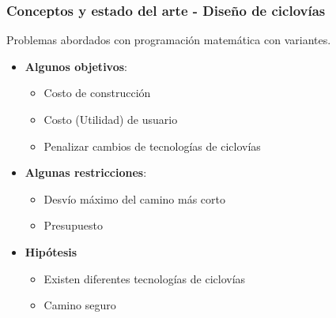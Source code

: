 \documentclass[aspectratio=43, 10pt]{beamer}
\begin{document}

\begin{frame}
    \frametitle{Conceptos y estado del arte - Diseño de ciclovías}

    Problemas abordados con programación matemática con variantes.

\begin{itemize} \item{
        \textbf{Algunos objetivos}:
        \begin{itemize}
            \item{Costo de construcción \parencite{Duthie2014}}
            \item{Costo (Utilidad) de usuario \parencite{Mauttone2017, Liu2019, baya2021}}
            \item{Penalizar cambios de tecnologías de ciclovías \parencite{baya2021}}
        \end{itemize}
    }
    \item{
        \textbf{Algunas restricciones}:
        \begin{itemize}
            \item{Desvío máximo del camino más corto \parencite{Duthie2014, lim2021}}
        \item{Presupuesto}
        \end{itemize}
    }
    \item{
        \textbf{Hipótesis}
        \begin{itemize}
            \item{Existen diferentes tecnologías de ciclovías \parencite{baya2021, Zhu2019}}
            \item{Camino seguro \parencite{Duthie2014, lim2021}}
        \end{itemize}
    }
    \end{itemize}
\end{frame}

\end{document}
